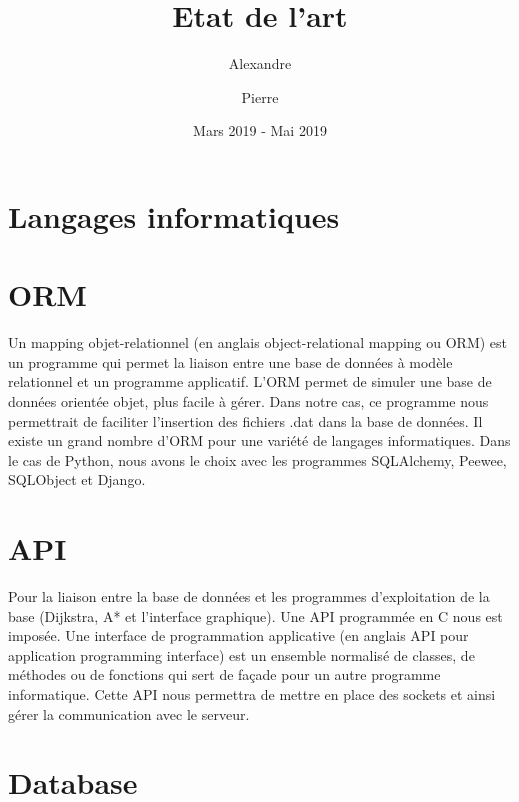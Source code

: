 \documentclass{article}
\title{Etat de l'art}
\author{
    Alexandre \sc{Cesari}
    \and
    Pierre \sc{Bouillon}
}
\date{Mars 2019 - Mai 2019}
\begin{document}
\maketitle

\newpage


\tableofcontents{}

\newpage


\section{Langages informatiques}



\section{ORM}

Un mapping objet-relationnel (en anglais object-relational mapping ou ORM) est un programme qui permet la liaison entre une base de données à modèle relationnel et un programme applicatif. L’ORM permet de simuler une base de données orientée objet, plus facile à gérer. Dans notre cas, ce programme nous permettrait de faciliter l’insertion des fichiers .dat dans la base de données. Il existe un grand nombre d’ORM pour une variété de langages informatiques.  Dans le cas de Python, nous avons le choix avec les programmes SQLAlchemy, Peewee, SQLObject et Django.


\section{API}

Pour la liaison entre la base de données et les programmes d’exploitation de la base (Dijkstra, A* et l’interface graphique). Une API programmée en C nous est imposée. Une interface de programmation applicative (en anglais API pour application programming interface) est un ensemble normalisé de classes, de méthodes ou de fonctions qui sert de façade pour un autre programme informatique. Cette API nous permettra de mettre en place des sockets et ainsi gérer la communication avec le serveur.


\section{Database}
\end{document}
